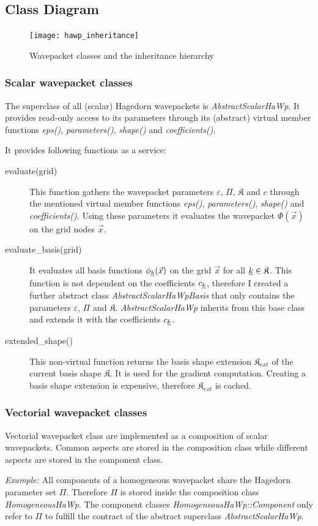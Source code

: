 \documentclass{article}
\begin{document}
\subsection{Class Diagram}

\begin{figure}[H]
  \centering
  \texttt{[image: hawp\_inheritance]}
  \caption{Wavepacket classes and the inheritance hierarchy}
  \label{fig:hawp_inheritance}
\end{figure}

\subsubsection{Scalar wavepacket classes}

The superclass of all (scalar) Hagedorn wavepackets is \emph{AbstractScalarHaWp}.
It provides read-only access to its parameters through its (abstract) virtual
member functions \emph{eps()}, \emph{parameters()}, \emph{shape()} and \emph{coefficients()}.

It provides following functions as a service:
\begin{description}
\item[evaluate(grid)]
This function gathers the wavepacket parameters \(\varepsilon\), \(\Pi\), \(\mathfrak{K}\) and \(c\) 
through the mentioned virtual member functions \emph{eps()}, \emph{parameters()},
\emph{shape()} and \emph{coefficients()}. Using these parameters it evaluates the wavepacket \(\Phi(\vec{x})\)
on the grid nodes \(\vec{x}\).
\item[evaluate\_basis(grid)]
  It evaluates all basis functions \(\phi_{\underline{k}}(\vec{x})\) on the grid \(\vec{x}\)
for all \(\underline{k} \in \mathfrak{K}\). This function is not dependent on the coefficients
\(c_{\underline{k}}\), therefore I created a further abstract class \emph{AbstractScalarHaWpBasis} that
only contains the parameters \(\varepsilon\), \(\Pi\) and \(\mathfrak{K}\). \emph{AbstractScalarHaWp}
inherits from this base class and extends it with the coefficients \(c_{\underline{k}}\).
\item[extended\_shape()]
  This non-virtual function returns the basis shape extension \(\mathfrak{K}_{ext}\)
  of the current basis shape \(\mathfrak{K}\). It is used for the gradient computation.
  Creating a basis shape extension is expensive, therefore \(\mathfrak{K}_{ext}\) is cached.
\end{description}

\subsubsection{Vectorial wavepacket classes}
Vectorial wavepacket class are implemented as a composition of scalar wavepackets.
Common aspects are stored in the composition class while different aspects are
stored in the component class.
\par
\emph{Example: } All components of a homogeneous wavepacket share the Hagedorn parameter
set \(\Pi\). Therefore \(\Pi\) is stored inside the composition class \emph{HomogeneousHaWp}.
The component classes \emph{HomogeneousHaWp::Component} only refer to \(\Pi\) to fulfill the contract
of the abstract superclass \emph{AbstractScalarHaWp}.
\end{document}
